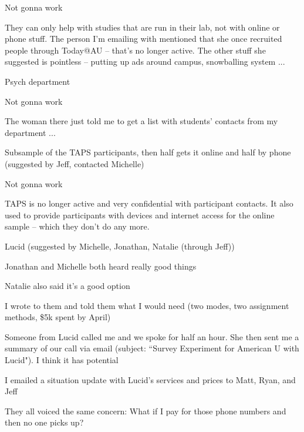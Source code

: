 \begin{coi}
\begin{coi}
					\begin{coi}
						\item Not gonna work
						\item They can only help with studies that are run in their lab, not with online or phone stuff. The person I'm emailing with mentioned that she once recruited people through Today@AU -- that's no longer active. The other stuff she suggested is pointless -- putting up ads around campus, snowballing system ... 
					\end{coi}
				\item Psych department
					\begin{coi}
						\item Not gonna work
						\item The woman there just told me to get a list with students' contacts from my department ...
					\end{coi} 
			\end{coi}
		\item Subsample of the TAPS participants, then half gets it online and half by phone (suggested by Jeff, contacted Michelle)
			\begin{coi}
				\item Not gonna work
				\item TAPS is no longer active and very confidential with participant contacts. It also used to provide participants with devices and internet access for the online sample -- which they don't do any more.
			\end{coi}
		\item Lucid (suggested by Michelle, Jonathan, Natalie (through Jeff))
			\begin{coi}
				\item Jonathan and Michelle both heard really good things
				\item Natalie also said it's a good option
				\item I wrote to them and told them what I would need (two modes, two assignment methods, \$5k spent by April)
				\item Someone from Lucid called me and we spoke for half an hour. She then sent me a summary of our call via email (subject: ``Survey Experiment for American U with Lucid"). I think it has potential
				\item I emailed a situation update with Lucid's services and prices to Matt, Ryan, and Jeff
				\item They all voiced the same concern: What if I pay for those phone numbers and then no one picks up?

\end{coi}
\end{coi}
